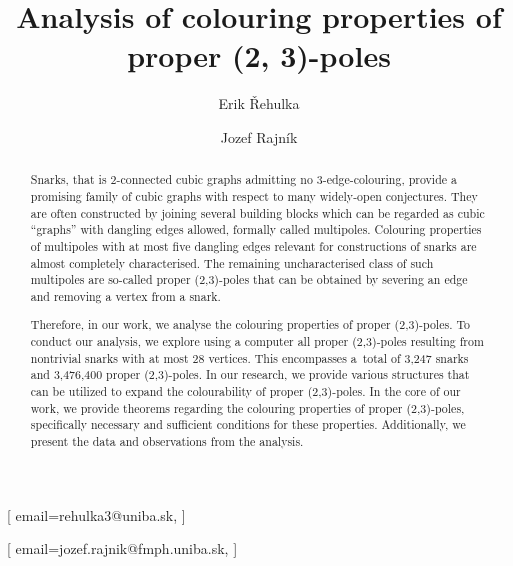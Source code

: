 \documentclass[
twocolumn,
]{ceurart}
\begin{document}


\title{Analysis of colouring properties of proper (2, 3)-poles}


\author[1]{Erik Řehulka}[%
email=rehulka3@uniba.sk,
]
\address[1]{Comenius University, Mlynská dolina, 842 48 Bratislava, Slovakia}

\author[1]{Jozef Rajník}[%
email=jozef.rajnik@fmph.uniba.sk,
]

\begin{abstract}
  Snarks, that is $2$-connected cubic graphs admitting no $3$-edge-colouring, provide a promising family of cubic graphs with respect to many widely-open conjectures. They are often constructed by joining several building blocks which can be regarded as cubic ``graphs'' with dangling edges allowed, formally called multipoles. Colouring properties of multipoles with at most five dangling edges relevant for constructions of snarks are almost completely characterised. The remaining uncharacterised class of such multipoles are so-called proper (2,3)-poles that can be obtained by severing an edge and removing a vertex from a snark.
    
   	Therefore, in our work, we analyse the colouring properties of proper (2,3)-poles. To conduct our analysis, we explore using a computer all proper (2,3)-poles resulting from nontrivial snarks with at most 28 vertices. This encompasses a~total of 3,247 snarks and 3,476,400 proper (2,3)-poles. In our research, we provide various structures that can be utilized to expand the colourability of proper (2,3)-poles. In the core of our work, we provide theorems regarding the colouring properties of proper (2,3)-poles, specifically necessary and sufficient conditions for these properties. Additionally, we present the data and observations from the analysis.
\end{abstract}
\end{document}
